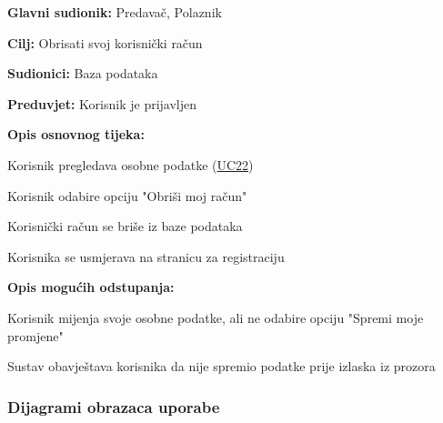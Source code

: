 			\begin{packed_item}
				
				\item \textbf{Glavni sudionik:} Predavač, Polaznik
				\item  \textbf{Cilj:} Obrisati svoj korisnički račun
				\item  \textbf{Sudionici:} Baza podataka
				\item  \textbf{Preduvjet:} Korisnik je prijavljen
				\item  \textbf{Opis osnovnog tijeka:}
				
				\item[] \begin{packed_enum}
					
					\item Korisnik pregledava osobne podatke (\hyperref[UC22] {UC22})
					\item Korisnik odabire opciju "Obriši moj račun"
					\item Korisnički račun se briše iz baze podataka
					\item Korisnika se usmjerava na stranicu za registraciju
					
				\end{packed_enum}
				\item  \textbf{Opis mogućih odstupanja:}
				
				\item[] \begin{packed_item}
					
					\item[2.a] Korisnik mijenja svoje osobne podatke, ali ne odabire opciju "Spremi moje promjene"
					\item[] \begin{packed_enum}
						
						\item Sustav obavještava korisnika da nije spremio podatke prije izlaska iz prozora
						
					\end{packed_enum}
					
				\end{packed_item}
			\eject
				
			\end{packed_item}
		
				\subsubsection{Dijagrami obrazaca uporabe}
					
